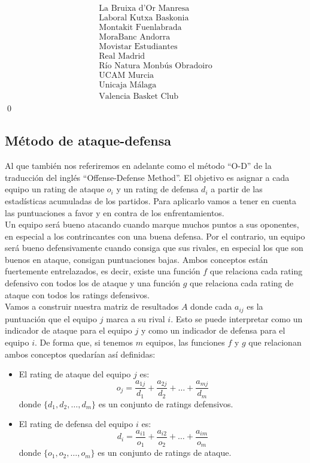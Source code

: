 \[\begin{array}{ccc}
\begin{array}{c}
	\text{La Bruixa d'Or Manresa} \\
	\text{Laboral Kutxa Baskonia} \\
	\text{Montakit Fuenlabrada} \\
	\text{MoraBanc Andorra} \\
	\text{Movistar Estudiantes} \\
	\text{Real Madrid} \\
	\text{Río Natura Monbús Obradoiro} \\
	\text{UCAM Murcia} \\
	\text{Unicaja Málaga} \\
	\text{Valencia Basket Club}
	\end{array}
	\end{array}
	\]
\qed


\subsection{Método de ataque-defensa}
Al que también nos referiremos en adelante como el método ``O-D'' de la traducción del inglés ``Offense-Defense Method''. El objetivo es asignar a cada equipo un rating de ataque $ o_{i} $ y un rating de defensa $d_{i}$ a partir de las estadísticas acumuladas de los partidos. Para aplicarlo vamos a tener en cuenta las puntuaciones a favor y en contra de los enfrentamientos.\\

Un equipo será bueno atacando cuando marque muchos puntos a sus oponentes, en especial a los contrincantes con una buena defensa. Por el contrario, un equipo será bueno defensivamente cuando consiga que sus rivales, en especial los que son buenos en ataque, consigan puntuaciones bajas. Ambos conceptos están fuertemente entrelazados, es decir, existe una función $f$ que relaciona cada rating defensivo con todos los de ataque y una función $g$ que relaciona cada rating de ataque con todos los ratings defensivos.\\

Vamos a construir nuestra matriz de resultados $A$ donde cada $a_{ij}$ es la puntuación que el equipo $j$ marca a su rival $i$. Esto se puede interpretar como un indicador de ataque para el equipo $j$ y como un indicador de defensa para el equipo $i$. De forma que, si tenemos $m$ equipos, las funciones $f$ y $g$ que relacionan ambos conceptos quedarían así definidas: 
\begin{itemize}
	\item El rating de ataque del equipo $j$ es:
	\begin{equation}
	o_{j} = \dfrac{a_{1j}}{d_{1}} + \dfrac{a_{2j}}{d_{2}} + \dots + \dfrac{a_{mj}}{d_{m}}  \label{ofens}
	\end{equation} 
	donde $\{d_{1},d_{2}, \dots ,d_{m}\}$ es un conjunto de ratings defensivos. 
	\item El rating de defensa del equipo $i$ es:
	\begin{equation}
	d_{i} = \dfrac{a_{i1}}{o_{1}} + \dfrac{a_{i2}}{o_{2}} + \dots + \dfrac{a_{im}}{o_{m}}  \label{defens}
	\end{equation} 
	donde $\{o_{1},o_{2}, \dots ,o_{m}\}$ es un conjunto de ratings de ataque. 
\end{itemize}

